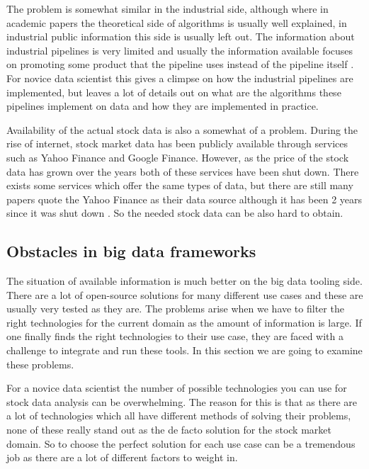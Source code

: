 The problem is somewhat similar in the industrial side, although where in academic papers the theoretical side of algorithms is usually well explained, in industrial public information this side is usually left out.
The information about industrial pipelines is very limited and usually the information available focuses on promoting some product that the pipeline uses instead of the pipeline itself \cite{palmer} \cite{snively}.
For novice data scientist this gives a climpse on how the industrial pipelines are implemented, but leaves a lot of details out on what are the algorithms these pipelines implement on data and how they are implemented in practice.

Availability of the actual stock data is also a somewhat of a problem.
During the rise of internet, stock market data has been publicly available through services such as Yahoo Finance and Google Finance.
However, as the price of the stock data has grown over the years both of these services have been shut down. \cite{lotter}
There exists some services which offer the same types of data, but there are still many papers quote the Yahoo Finance as their data source although it has been 2 years since it was shut down \cite{serez2} \cite{le}.
So the needed stock data can be also hard to obtain.

\subsection{Obstacles in big data frameworks}

The situation of available information is much better on the big data tooling side.
There are a lot of open-source solutions for many different use cases and these are usually very tested as they are.
The problems arise when we have to filter the right technologies for the current domain as the amount of information is large.
If one finally finds the right technologies to their use case, they are faced with a challenge to integrate and run these tools. 
In this section we are going to examine these problems.

For a novice data scientist the number of possible technologies you can use for stock data analysis can be overwhelming.
The reason for this is that as there are a lot of technologies which all have different methods of solving their problems, none of these really stand out as the de facto solution for the stock market domain.
So to choose the perfect solution for each use case can be a tremendous job as there are a lot of different factors to weight in.

